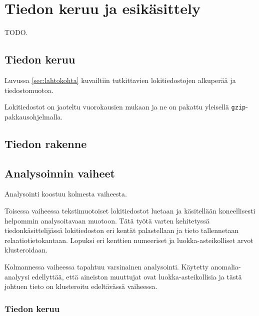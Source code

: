 
\chapter{Tiedon keruu ja esikäsittely}

TODO.


\section{Tiedon keruu}

Luvussa \ref{sec:lahtokohta} kuvailtiin tutkittavien lokitiedostojen
alkuperää ja tiedostomuotoa.

Lokitiedostot on jaoteltu vuorokausien mukaan ja ne on pakattu
yleisellä \texttt{gzip}-pakkausohjelmalla.

\section{Tiedon rakenne}

\section{Analysoinnin vaiheet}

Analysointi koostuu kolmesta vaiheesta.

Toisessa vaiheessa tekstimuotoiset lokitiedostot luetaan ja
käsitellään koneellisesti helpommin analysoitavaan
muotoon. Tätä työtä varten kehitetyssä tiedonkäsittelijässä
lokitiedoston eri kentät palastellaan ja tieto tallennetaan
relaatiotietokantaan. Lopuksi eri kenttien numeeriset ja
luokka-asteikolliset arvot klusteroidaan.

Kolmannessa vaiheessa tapahtuu varsinainen analysointi. Käytetty
anomalia-analyysi edellyttää, että aineiston muuttujat ovat
luokka-asteikollisia ja tästä johtuen tieto on klusteroitu edeltävässä vaiheessa.

\subsection{Tiedon keruu}

